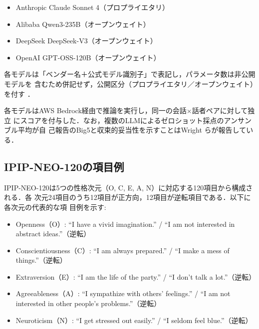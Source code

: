 \documentclass[dvipdfmx,11pt,a4paper]{bxjsarticle}
\renewcommand{\_}{\paperorigunderscore\allowbreak}%
\begin{document}

\begin{itemize}
  \item Anthropic Claude Sonnet 4（プロプライエタリ）
  \item Alibaba Qwen3-235B（オープンウェイト）
  \item DeepSeek DeepSeek-V3（オープンウェイト）
  \item OpenAI GPT-OSS-120B（オープンウェイト）
\end{itemize}

各モデルは「ベンダー名＋公式モデル識別子」で表記し，パラメータ数は非公開モデルを
含むため併記せず，公開区分（プロプライエタリ／オープンウェイト）を付す
\cite{wright2026}．

各モデルはAWS Bedrock経由で推論を実行し，同一の会話$\times$話者ペアに対して独立
にスコアを付与した．なお，複数のLLMによるゼロショット採点のアンサンブル平均が自
己報告のBig5と収束的妥当性を示すことはWright ら\cite{wright2026}が報告している．


\subsection{IPIP-NEO-120の項目例}
\label{sec:appendix_ipip}

IPIP-NEO-120は5つの性格次元（O, C, E, A, N）に対応する120項目から構成される．各
次元24項目のうち12項目が正方向，12項目が逆転項目である．以下に各次元の代表的な項
目例を示す:

\begin{itemize}
  \item Openness（O）: ``I have a vivid imagination.'' / ``I am not interested in abstract ideas.''（逆転）
  \item Conscientiousness（C）: ``I am always prepared.'' / ``I make a mess of things.''（逆転）
  \item Extraversion（E）: ``I am the life of the party.'' / ``I don't talk a lot.''（逆転）
  \item Agreeableness（A）: ``I sympathize with others' feelings.'' / ``I am not interested in other people's problems.''（逆転）
  \item Neuroticism（N）: ``I get stressed out easily.'' / ``I seldom feel blue.''（逆転）
\end{itemize}
\end{document}
